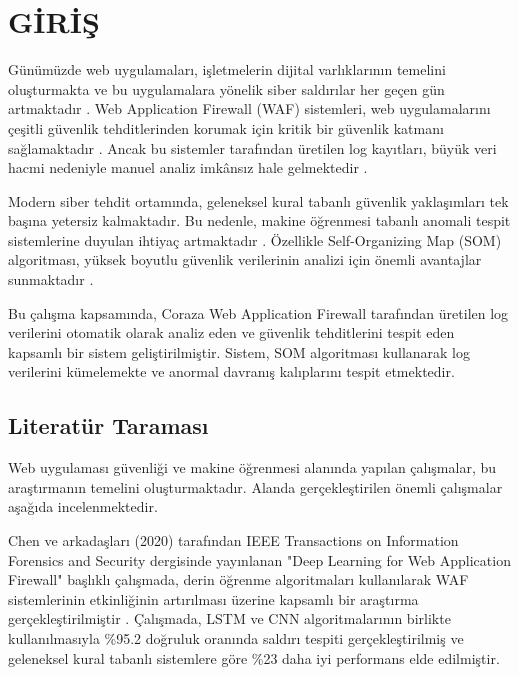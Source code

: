 \section{GİRİŞ}

Günümüzde web uygulamaları, işletmelerin dijital varlıklarının temelini oluşturmakta ve bu uygulamalara yönelik siber saldırılar her geçen gün artmaktadır \cite{web_attacks_taxonomy2020}. Web Application Firewall (WAF) sistemleri, web uygulamalarını çeşitli güvenlik tehditlerinden korumak için kritik bir güvenlik katmanı sağlamaktadır \cite{waf_security2022}. Ancak bu sistemler tarafından üretilen log kayıtları, büyük veri hacmi nedeniyle manuel analiz imkânsız hale gelmektedir \cite{log_analysis_ml2020}.

Modern siber tehdit ortamında, geleneksel kural tabanlı güvenlik yaklaşımları tek başına yetersiz kalmaktadır. Bu nedenle, makine öğrenmesi tabanlı anomali tespit sistemlerine duyulan ihtiyaç artmaktadır \cite{chandola2009anomaly}. Özellikle Self-Organizing Map (SOM) algoritması, yüksek boyutlu güvenlik verilerinin analizi için önemli avantajlar sunmaktadır \cite{som_cybersecurity2021}.

Bu çalışma kapsamında, Coraza Web Application Firewall \cite{coraza2023} tarafından üretilen log verilerini otomatik olarak analiz eden ve güvenlik tehditlerini tespit eden kapsamlı bir sistem geliştirilmiştir. Sistem, SOM algoritması \cite{kohonen2001self} kullanarak log verilerini kümelemekte ve anormal davranış kalıplarını tespit etmektedir.

\subsection{Literatür Taraması}

Web uygulaması güvenliği ve makine öğrenmesi alanında yapılan çalışmalar, bu araştırmanın temelini oluşturmaktadır. Alanda gerçekleştirilen önemli çalışmalar aşağıda incelenmektedir.

Chen ve arkadaşları (2020) tarafından IEEE Transactions on Information Forensics and Security dergisinde yayınlanan "Deep Learning for Web Application Firewall" başlıklı çalışmada, derin öğrenme algoritmaları kullanılarak WAF sistemlerinin etkinliğinin artırılması üzerine kapsamlı bir araştırma gerçekleştirilmiştir \cite{chen2020deep}. Çalışmada, LSTM ve CNN algoritmalarının birlikte kullanılmasıyla \%95.2 doğruluk oranında saldırı tespiti gerçekleştirilmiş ve geleneksel kural tabanlı sistemlere göre \%23 daha iyi performans elde edilmiştir.

